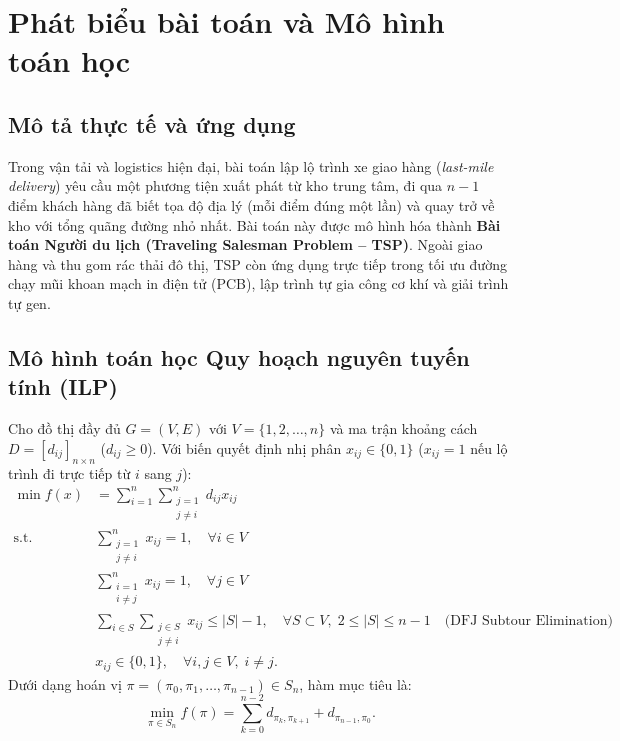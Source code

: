 \documentclass[12pt,a4paper]{report}
\begin{document}
\tableofcontents
\newpage

\chapter{Phát biểu bài toán và Mô hình toán học}

\section{Mô tả thực tế và ứng dụng}
Trong vận tải và logistics hiện đại, bài toán lập lộ trình xe giao hàng (\textit{last-mile delivery}) yêu cầu một phương tiện xuất phát từ kho trung tâm, đi qua $n-1$ điểm khách hàng đã biết tọa độ địa lý (mỗi điểm đúng một lần) và quay trở về kho với tổng quãng đường nhỏ nhất. Bài toán này được mô hình hóa thành \textbf{Bài toán Người du lịch (Traveling Salesman Problem -- TSP)}. Ngoài giao hàng và thu gom rác thải đô thị, TSP còn ứng dụng trực tiếp trong tối ưu đường chạy mũi khoan mạch in điện tử (PCB), lập trình tự gia công cơ khí và giải trình tự gen.

\section{Mô hình toán học Quy hoạch nguyên tuyến tính (ILP)}
Cho đồ thị đầy đủ $G=(V,E)$ với $V=\{1,2,\dots,n\}$ và ma trận khoảng cách $D=[d_{ij}]_{n\times n}$ ($d_{ij}\ge 0$). Với biến quyết định nhị phân $x_{ij} \in \{0,1\}$ ($x_{ij}=1$ nếu lộ trình đi trực tiếp từ $i$ sang $j$):
\begin{align}
    \min f(x) &= \sum_{i=1}^{n} \sum_{\substack{j=1 \\ j \neq i}}^{n} d_{ij} x_{ij} \\
    \text{s.t.} \quad &\sum_{\substack{j=1 \\ j \neq i}}^{n} x_{ij} = 1, \quad \forall i \in V \\
    &\sum_{\substack{i=1 \\ i \neq j}}^{n} x_{ij} = 1, \quad \forall j \in V \\
    &\sum_{i \in S} \sum_{\substack{j \in S \\ j \neq i}} x_{ij} \le |S| - 1, \quad \forall S \subset V, \; 2 \le |S| \le n - 1 \quad \text{(DFJ Subtour Elimination)} \\
    &x_{ij} \in \{0, 1\}, \quad \forall i, j \in V, \; i \neq j.
\end{align}
Dưới dạng hoán vị $\pi = (\pi_0, \pi_1, \dots, \pi_{n-1}) \in S_n$, hàm mục tiêu là:
\begin{equation}
    \min_{\pi \in S_n} f(\pi) = \sum_{k=0}^{n-2} d_{\pi_k, \pi_{k+1}} + d_{\pi_{n-1}, \pi_0}.
\end{equation}
\end{document}
